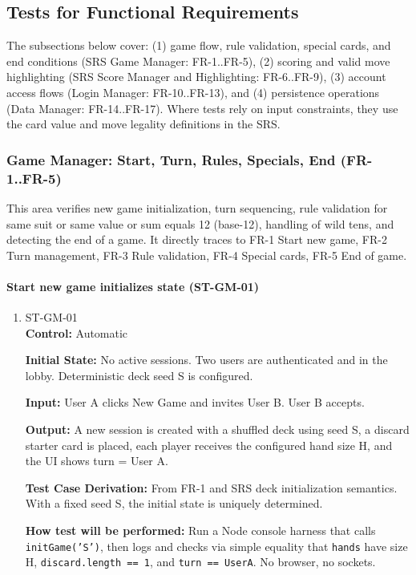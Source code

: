 \documentclass[12pt, titlepage]{article}
\begin{document}
\subsection{Tests for Functional Requirements}

The subsections below cover: (1) game flow, rule validation, special cards, and end conditions (SRS Game Manager: FR-1..FR-5), (2) scoring and valid move highlighting (SRS Score Manager and Highlighting: FR-6..FR-9), (3) account access flows (Login Manager: FR-10..FR-13), and (4) persistence operations (Data Manager: FR-14..FR-17). Where tests rely on input constraints, they use the card value and move legality definitions in the SRS.

\subsubsection{Game Manager: Start, Turn, Rules, Specials, End (FR-1..FR-5)}

This area verifies new game initialization, turn sequencing, rule validation for same suit or same value or sum equals 12 (base-12), handling of wild tens, and detecting the end of a game. It directly traces to FR-1 Start new game, FR-2 Turn management, FR-3 Rule validation, FR-4 Special cards, FR-5 End of game.

\paragraph{Start new game initializes state (ST-GM-01)}
\begin{enumerate}
\item{ST-GM-01\\}
\textbf{Control:} Automatic

\textbf{Initial State:} No active sessions. Two users are authenticated and in the lobby. Deterministic deck seed S is configured.

\textbf{Input:} User A clicks New Game and invites User B. User B accepts.

\textbf{Output:} A new session is created with a shuffled deck using seed S, a discard starter card is placed, each player receives the configured hand size H, and the UI shows turn = User A.

\textbf{Test Case Derivation:} From FR-1 and SRS deck initialization semantics. With a fixed seed S, the initial state is uniquely determined.

\textbf{How test will be performed:} Run a Node console harness that calls \texttt{initGame('S')}, then logs and checks via simple equality that \texttt{hands} have size H, \texttt{discard.length == 1}, and \texttt{turn == UserA}. No browser, no sockets.
\end{enumerate}
\end{document}
